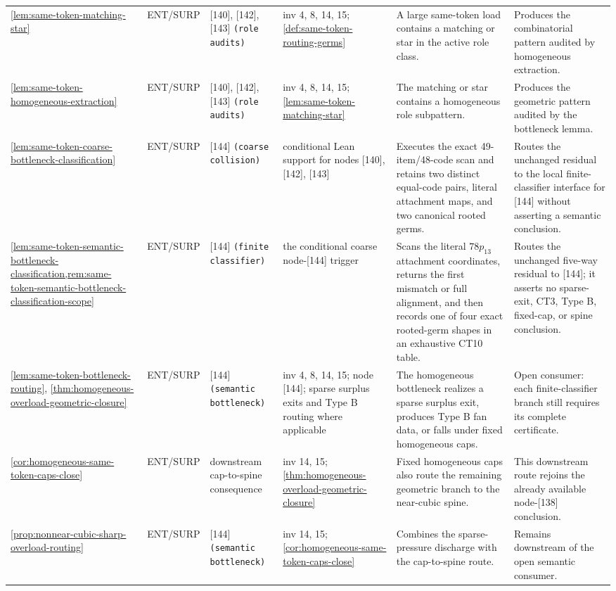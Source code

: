 \documentclass[11pt]{article}
\begin{document}
{\begin{longtable}{L{0.10\textwidth} C{0.045\textwidth} L{0.13\textwidth} L{0.135\textwidth} L{0.28\textwidth} L{0.20\textwidth}}
\cref{lem:same-token-matching-star} & ENT\slash SURP & [140], [142], [143] \texttt{(role audits)} & inv 4, 8, 14, 15; \cref{def:same-token-routing-germs} & A large same-token load contains a matching or star in the active role class. & Produces the combinatorial pattern audited by homogeneous extraction. \\
\cref{lem:same-token-homogeneous-extraction} & ENT\slash SURP & [140], [142], [143] \texttt{(role audits)} & inv 4, 8, 14, 15; \cref{lem:same-token-matching-star} & The matching or star contains a homogeneous role subpattern. & Produces the geometric pattern audited by the bottleneck lemma. \\
\cref{lem:same-token-coarse-bottleneck-classification} & ENT\slash SURP & [144] \texttt{(coarse collision)} & conditional Lean support for nodes [140], [142], [143] & Executes the exact 49-item/48-code scan and retains two distinct equal-code pairs, literal attachment maps, and two canonical rooted germs. & Routes the unchanged residual to the local finite-classifier interface for [144] without asserting a semantic conclusion. \\
\cref{lem:same-token-semantic-bottleneck-classification,rem:same-token-semantic-bottleneck-classification-scope} & ENT\slash SURP & [144] \texttt{(finite classifier)} & the conditional coarse node-[144] trigger & Scans the literal \(78p_{13}\) attachment coordinates, returns the first mismatch or full alignment, and then records one of four exact rooted-germ shapes in an exhaustive CT10 table. & Routes the unchanged five-way residual to [144]; it asserts no sparse-exit, CT3, Type B, fixed-cap, or spine conclusion. \\
\cref{lem:same-token-bottleneck-routing}, \cref{thm:homogeneous-overload-geometric-closure} & ENT\slash SURP & [144] \texttt{(semantic bottleneck)} & inv 4, 8, 14, 15; node [144]; sparse surplus exits and Type B routing where applicable & The homogeneous bottleneck realizes a sparse surplus exit, produces Type B fan data, or falls under fixed homogeneous caps. & Open consumer: each finite-classifier branch still requires its complete certificate. \\
\cref{cor:homogeneous-same-token-caps-close} & ENT\slash SURP & downstream cap-to-spine consequence & inv 14, 15; \cref{thm:homogeneous-overload-geometric-closure} & Fixed homogeneous caps also route the remaining geometric branch to the near-cubic spine. & This downstream route rejoins the already available node-[138] conclusion. \\
\cref{prop:nonnear-cubic-sharp-overload-routing} & ENT\slash SURP & [144] \texttt{(semantic bottleneck)} & inv 14, 15; \cref{cor:homogeneous-same-token-caps-close} & Combines the sparse-pressure discharge with the cap-to-spine route. & Remains downstream of the open semantic consumer. \\

\end{longtable}}
\end{document}
